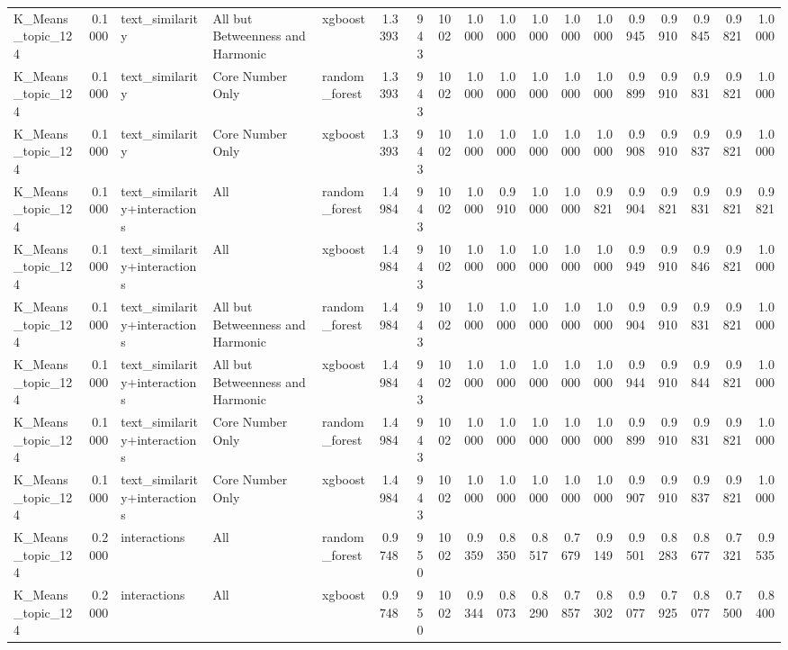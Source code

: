\begin{tabular}{lrlllrrrrrrrrrrrrr}
K_Means_topic_124 & 0.1000 & text_similarity & All but Betweenness and Harmonic & xgboost & 1.3393 & 943 & 1002 & 1.0000 & 1.0000 & 1.0000 & 1.0000 & 1.0000 & 0.9945 & 0.9910 & 0.9845 & 0.9821 & 1.0000 \\
K_Means_topic_124 & 0.1000 & text_similarity & Core Number Only & random_forest & 1.3393 & 943 & 1002 & 1.0000 & 1.0000 & 1.0000 & 1.0000 & 1.0000 & 0.9899 & 0.9910 & 0.9831 & 0.9821 & 1.0000 \\
K_Means_topic_124 & 0.1000 & text_similarity & Core Number Only & xgboost & 1.3393 & 943 & 1002 & 1.0000 & 1.0000 & 1.0000 & 1.0000 & 1.0000 & 0.9908 & 0.9910 & 0.9837 & 0.9821 & 1.0000 \\
K_Means_topic_124 & 0.1000 & text_similarity+interactions & All & random_forest & 1.4984 & 943 & 1002 & 1.0000 & 0.9910 & 1.0000 & 1.0000 & 0.9821 & 0.9904 & 0.9821 & 0.9831 & 0.9821 & 0.9821 \\
K_Means_topic_124 & 0.1000 & text_similarity+interactions & All & xgboost & 1.4984 & 943 & 1002 & 1.0000 & 1.0000 & 1.0000 & 1.0000 & 1.0000 & 0.9949 & 0.9910 & 0.9846 & 0.9821 & 1.0000 \\
K_Means_topic_124 & 0.1000 & text_similarity+interactions & All but Betweenness and Harmonic & random_forest & 1.4984 & 943 & 1002 & 1.0000 & 1.0000 & 1.0000 & 1.0000 & 1.0000 & 0.9904 & 0.9910 & 0.9831 & 0.9821 & 1.0000 \\
K_Means_topic_124 & 0.1000 & text_similarity+interactions & All but Betweenness and Harmonic & xgboost & 1.4984 & 943 & 1002 & 1.0000 & 1.0000 & 1.0000 & 1.0000 & 1.0000 & 0.9944 & 0.9910 & 0.9844 & 0.9821 & 1.0000 \\
K_Means_topic_124 & 0.1000 & text_similarity+interactions & Core Number Only & random_forest & 1.4984 & 943 & 1002 & 1.0000 & 1.0000 & 1.0000 & 1.0000 & 1.0000 & 0.9899 & 0.9910 & 0.9831 & 0.9821 & 1.0000 \\
K_Means_topic_124 & 0.1000 & text_similarity+interactions & Core Number Only & xgboost & 1.4984 & 943 & 1002 & 1.0000 & 1.0000 & 1.0000 & 1.0000 & 1.0000 & 0.9907 & 0.9910 & 0.9837 & 0.9821 & 1.0000 \\
K_Means_topic_124 & 0.2000 & interactions & All & random_forest & 0.9748 & 950 & 1002 & 0.9359 & 0.8350 & 0.8517 & 0.7679 & 0.9149 & 0.9501 & 0.8283 & 0.8677 & 0.7321 & 0.9535 \\
K_Means_topic_124 & 0.2000 & interactions & All & xgboost & 0.9748 & 950 & 1002 & 0.9344 & 0.8073 & 0.8290 & 0.7857 & 0.8302 & 0.9077 & 0.7925 & 0.8077 & 0.7500 & 0.8400 \\

\end{tabular}
